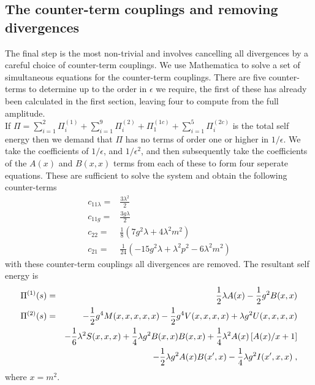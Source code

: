 \documentclass[11pt]{article}
\begin{document}
\subsection{The counter-term couplings and removing divergences}

The final step is the most non-trivial and involves cancelling all divergences by a careful choice of counter-term couplings.  We use Mathematica to solve a set of simultaneous equations for the counter-term couplings.  There are five counter-terms to determine up to the order in $\epsilon$ we require, the first of these has already been calculated in the first section, leaving four to compute from the full amplitude.\\

If $\Pi=\sum_{i=1}^{2} \Pi^{(1)}_i + \sum_{i=1}^{9} \Pi^{(2)}_i + \Pi^{(1c)}_1 + \sum_{i=1}^{5} \Pi^{(2c)}_i$ is the total self energy then we demand that $\Pi$ has no terms of order one or higher in $1/\epsilon$.  We take the coefficients of $1/\epsilon$, and $1/\epsilon^2$, and then subsequently take the coefficients of the $A(x)$ and $B(x,x)$ terms from each of these to form four seperate equations.  These are sufficient to solve the system and obtain the following counter-terms
\begin{align}
c_{11\lambda}=& \frac{3\lambda^2}{2}\\
c_{11g}=& \frac{3g\lambda}{2}\\
c_{22}=& \frac{1}{8}\left(7g^2\lambda+4\lambda^2m^2\right)\\
c_{21}=& \frac{1}{24}\left(-15g^2\lambda+\lambda^2p^2-6\lambda^2m^2\right)
\end{align}
with these counter-term couplings all divergences are removed.  The resultant self energy is
\begin{eqnarray}
\Pi^{(1)}(s) &=& {1\over2}\lambda A(x) - {1\over2}g^2 B(x,x)\\
\Pi^{(2)}(s) &=& -{1\over2}g^4 M(x,x,x,x,x) 
-{1\over2}g^4V(x,x,x,x) +\lambda g^2U(x,x,x,x)
\nonumber\\
&& -{1\over6}\lambda^2 S(x,x,x)
+{1\over4}\lambda g^2 B(x,x)B(x,x)
+{1\over4}\lambda^2 A(x)\left[A(x)/x+1\right]\\
&& - {1\over2}\lambda g^2 A(x)B(x^\prime,x)
- {1\over4}\lambda g^2 I(x^\prime,x,x)\; ,
\nonumber
\end{eqnarray}
where $x=m^2$.
\end{document}
